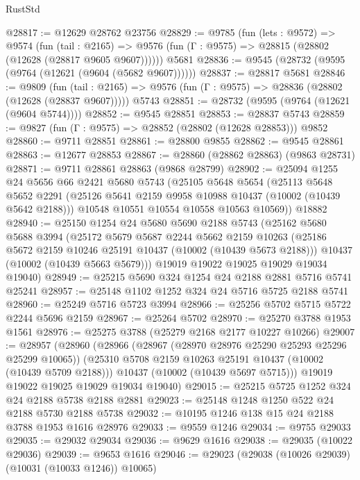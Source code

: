 \begin{lexlean}{RustStd}
\begin{coremodule}
@28817 := @12629 @28762 @23756
@28829 := @9785
    (fun (lets : @9572) =>
    @9574
      (fun (tail : @2165) =>
      @9576 (fun (Γ : @9575) => @28815 (@28802 (@12628 (@28817 @9605 @9607))))))
    @5681
@28836 := @9545 (@28732 (@9595 (@9764 (@12621 (@9604 (@5682 @9607))))))
@28837 := @28817 @5681
@28846 := @9809
    (fun (tail : @2165) => @9576 (fun (Γ : @9575) => @28836 (@28802 (@12628 (@28837 @9607)))))
    @5743
@28851 := @28732 (@9595 (@9764 (@12621 (@9604 @5744))))
@28852 := @9545 @28851
@28853 := @28837 @5743
@28859 := @9827 (fun (Γ : @9575) => @28852 (@28802 (@12628 @28853))) @9852
@28860 := @9711 @28851
@28861 := @28800 @9855
@28862 := @9545 @28861
@28863 := @12677 @28853
@28867 := @28860 (@28862 @28863) (@9863 @28731)
@28871 := @9711 @28861 @28863 (@9868 @28799)
@28902 := @25094
    @1255
    @24
    @5656
    @66
    @2421
    @5680
    @5743
    (@25105
      @5648
      @5654
      (@25113
        @5648
        @5652
        @2291
        (@25126 @5641 @2159 @9958 @10988 @10437 (@10002 (@10439 @5642 @2188)))
        @10548
        @10551
        @10554
        @10558
        @10563
        @10569))
    @18882
@28940 := @25150
    @1254
    @24
    @5680
    @5690
    @2188
    @5743
    (@25162
      @5680
      @5688
      @3994
      (@25172
        @5679
        @5687
        @2244
        @5662
        @2159
        @10263
        (@25186 @5672 @2159 @10246 @25191 @10437 (@10002 (@10439 @5673 @2188)))
        @10437
        (@10002 (@10439 @5663 @5679)))
      @19019
      @19022
      @19025
      @19029
      @19034
      @19040)
@28949 := @25215 @5690 @324 @1254 @24 @2188 @2881 @5716 @5741 @25241
@28957 := @25148 @1102 @1252 @324 @24 @5716 @5725 @2188 @5741
@28960 := @25249 @5716 @5723 @3994
@28966 := @25256 @5702 @5715 @5722 @2244 @5696 @2159
@28967 := @25264 @5702
@28970 := @25270 @3788 @1953 @1561
@28976 := @25275 @3788 (@25279 @2168 @2177 @10227 @10266)
@29007 := @28957
    (@28960
      (@28966
        (@28967 (@28970 @28976 @25290 @25293 @25296 @25299 @10065))
        (@25310 @5708 @2159 @10263 @25191 @10437 (@10002 (@10439 @5709 @2188)))
        @10437
        (@10002 (@10439 @5697 @5715)))
      @19019
      @19022
      @19025
      @19029
      @19034
      @19040)
@29015 := @25215 @5725 @1252 @324 @24 @2188 @5738 @2188 @2881
@29023 := @25148 @1248 @1250 @522 @24 @2188 @5730 @2188 @5738
@29032 := @10195 @1246 @138 @15 @24 @2188 @3788 @1953 @1616 @28976
@29033 := @9559 @1246
@29034 := @9755 @29033
@29035 := @29032 @29034
@29036 := @9629 @1616
@29038 := @29035 (@10022 @29036)
@29039 := @9653 @1616
@29046 := @29023 (@29038 (@10026 @29039) (@10031 (@10033 @1246)) @10065)

\end{coremodule}
\end{lexlean}
